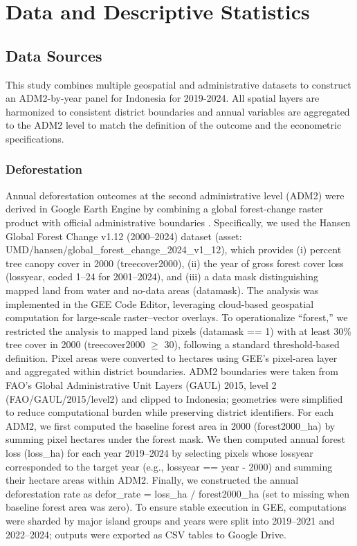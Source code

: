 \documentclass[hidelinks,12pt]{article}
\begin{document}
\section{Data and Descriptive Statistics} \label{sec:data}

\subsection{Data Sources} 




This study combines multiple geospatial and administrative datasets to construct an ADM2-by-year panel for Indonesia for 2019-2024. All spatial layers are harmonized to consistent district boundaries and annual variables are aggregated to the ADM2 level to match the definition of the outcome and the econometric specifications.


\subsubsection{Deforestation} 
Annual deforestation outcomes at the second administrative level (ADM2)\citep{fao2015gaul_level2_gee} were derived in Google Earth Engine \citep{gorelick2017gee} by combining a global forest-change raster product with official administrative boundaries \citep{hansen2013gfc,hansen2024gfc_v112_gee}. Specifically, we used the Hansen Global Forest Change v1.12 (2000–2024) dataset (asset: UMD/hansen/global\_forest\_change\_2024\_v1\_12), which provides (i) percent tree canopy cover in 2000 (treecover2000), (ii) the year of gross forest cover loss (lossyear, coded 1–24 for 2001–2024), and (iii) a data mask distinguishing mapped land from water and no-data areas (datamask). The analysis was implemented in the GEE Code Editor, leveraging cloud-based geospatial computation for large-scale raster–vector overlays. 
To operationalize “forest,” we restricted the analysis to mapped land pixels (datamask == 1) with at least 30\% tree cover in 2000 (treecover2000 $\ge$ 30), following a standard threshold-based definition. 
Pixel areas were converted to hectares using GEE’s pixel-area layer and aggregated within district boundaries. ADM2 boundaries were taken from FAO’s Global Administrative Unit Layers (GAUL) 2015, level 2 (FAO/GAUL/2015/level2) \citep{fao2015gaul_simplified_gee} and clipped to Indonesia; geometries were simplified to reduce computational burden while preserving district identifiers. For each ADM2, we first computed the baseline forest area in 2000 (forest2000\_ha) by summing pixel hectares under the forest mask. We then computed annual forest loss (loss\_ha) for each year 2019–2024 by selecting pixels whose lossyear corresponded to the target year (e.g., lossyear == year - 2000) and summing their hectare areas within ADM2. Finally, we constructed the annual deforestation rate as defor\_rate = loss\_ha / forest2000\_ha (set to missing when baseline forest area was zero). To ensure stable execution in GEE, computations were sharded by major island groups and years were split into 2019–2021 and 2022–2024; outputs were exported as CSV tables to Google Drive.
\end{document}
